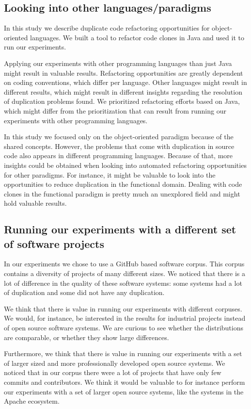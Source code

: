 \subsection{Looking into other languages/paradigms}
In this study we describe duplicate code refactoring opportunities for object-oriented languages. We built a tool to refactor code clones in Java and used it to run our experiments.

Applying our experiments with other programming languages than just Java might result in valuable results. Refactoring opportunities are greatly dependent on coding conventions, which differ per language. Other languages might result in different results, which might result in different insights regarding the resolution of duplication problems found. We prioritized refactoring efforts based on Java, which might differ from the prioritization that can result from running our experiments with other programming languages.

In this study we focused only on the object-oriented paradigm because of the shared concepts. However, the problems that come with duplication in source code also appears in different programming languages. Because of that, more insights could be obtained when looking into automated refactoring opportunities for other paradigms. For instance, it might be valuable to look into the opportunities to reduce duplication in the functional domain. Dealing with code clones in the functional paradigm is pretty much an unexplored field and might hold valuable results.

\subsection{Running our experiments with a different set of software projects}
In our experiments we chose to use a GitHub based software corpus. This corpus contains a diversity of projects of many different sizes. We noticed that there is a lot of difference in the quality of these software systems: some systems had a lot of duplication and some did not have any duplication.

We think that there is value in running our experiments with different corpuses. We would, for instance, be interested in the results for industrial projects instead of open source software systems. We are curious to see whether the distributions are comparable, or whether they show large differences.

Furthermore, we think that there is value in running our experiments with a set of larger sized and more professionally developed open source systems. We noticed that in our corpus there were a lot of projects that have only few commits and contributors. We think it would be valuable to for instance perform our experiments with a set of larger open source systems, like the systems in the Apache ecosystem.

